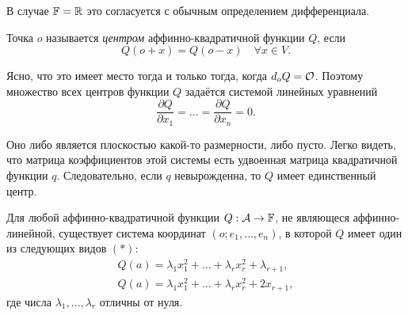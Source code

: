 В случае $\mathbb{F} = \mathbb{R}$ это согласуется с обычным определением дифференциала.

\begin{definition}
    Точка $o$ называется \textit{центром} аффинно-квадратичной функции $Q$, если
    \[
        Q(o + x) = Q(o - x)\quad\forall x \in V.
    \]
\end{definition}

Ясно, что это имеет место тогда и только тогда, когда $d_oQ = \mathcal{O}$. Поэтому множество всех центров функции $Q$ задаётся системой линейных уравнений
\[
    \frac{\partial Q}{\partial x_1} = \ldots = \frac{\partial Q}{\partial x_n} = 0.
\]

Оно либо является плоскостью какой-то размерности, либо пусто. Легко видеть, что матрица коэффициентов этой системы есть удвоенная матрица квадратичной функции $q$. Следовательно, если $q$ невырожденна, то $Q$ имеет единственный центр.

\begin{theorem}
    Для любой аффинно-квадратичной функции $Q: \mathcal{A} \to \mathbb{F}$, не являющеся аффинно-линейной, существует система координат $(o; e_1, \ldots, e_n)$, в которой $Q$ имеет один из следующих видов $(\ast)$:
    \begin{gather*}
        Q(a) = \lambda_1x_1^2 + \ldots + \lambda_rx_r^2 + \lambda_{r + 1},\\
        Q(a) = \lambda_1x_1^2 + \ldots + \lambda_rx_r^2 + 2x_{r + 1},
    \end{gather*}
    где числа $\lambda_1, \ldots, \lambda_r$ отличны от нуля.
\end{theorem}

